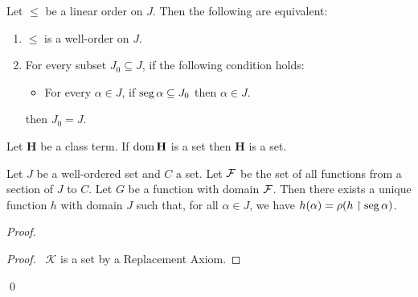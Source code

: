 \begin{theorem}
    Let $\leq$ be a linear order on $J$. Then the following are equivalent:
    \begin{enumerate}
        \item $\leq$ is a well-order on $J$.
        \item For every subset $J_0 \subseteq J$, if the following condition holds:
        \begin{itemize}
            \item For every $\alpha \in J$, if $\operatorname{seg} \alpha \subseteq J_0$ then $\alpha \in J$.
        \end{itemize}
        then $J_0 = J$.
    \end{enumerate}
\end{theorem}

\begin{axioms}[Replacement]
    Let $\mathbf{H}$ be a class term. If $\operatorname{dom} \mathbf{H}$ is a set
    then $\mathbf{H}$ is a set.
\end{axioms}

\begin{theorem}
    Let $J$ be a well-ordered set and $C$ a set. Let $\mathcal{F}$ be the set of all functions from a section of $J$ to $C$.
    Let $G$ be a function with domain $\mathcal{F}$. Then there exists a unique function $h$ with domain $J$
    such that, for all $\alpha \in J$,
    we have $h(\alpha) = \rho(h \restriction \operatorname{seg} \alpha)$.
\end{theorem}

\begin{proof}
    \pf
    \begin{proof}
        \pf\ $\mathcal{K}$ is a set by a Replacement Axiom.
    \end{proof}
    \qed
\end{proof}

